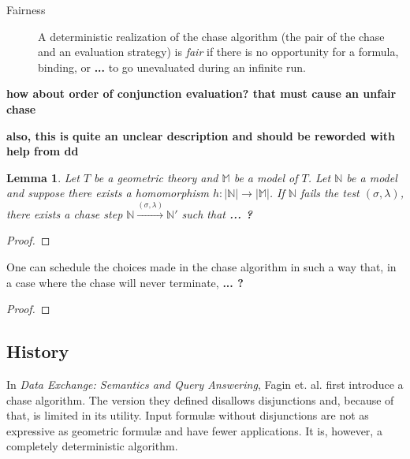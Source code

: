 		\label{fairness_definition}
		\begin{description}
		\item [Fairness] A deterministic realization of the chase algorithm
		(the pair of the chase and an evaluation strategy) is \emph{fair} if
		there is no opportunity for a formula, binding, or \textbf{...} to go
		unevaluated during an infinite run.
		\end{description}

		\textbf{how about order of conjunction evaluation? that must cause an unfair chase}

		\textbf{also, this is quite an unclear description and should be reworded with help from dd}

		\newtheorem{chase_lemma}{Lemma}
		\begin{chase_lemma}
			Let $T$ be a geometric theory and $\mathbb{M}$ be a model of $T$.
			Let $\mathbb{N}$ be a model and suppose there exists a homomorphism
			$h : |\mathbb{N}| \to |\mathbb{M}|$. If $\mathbb{N}$ fails the test
			$(\sigma,\lambda)$, there exists a chase step $\mathbb{N}
			\xrightarrow{(\sigma,\lambda)} \mathbb{N}'$ such that \textbf{... ?}
		\end{chase_lemma}

		\begin{proof}
			
		\end{proof}

		\begin{theorem}
			One can schedule the choices made in the chase algorithm in such a
			way that, in a case where the chase will never terminate,
			\textbf{... ?}
		\end{theorem}

		\begin{proof}
			
		\end{proof}

	\subsection{History}

		In \cite{FKMP02} \emph{Data Exchange: Semantics and Query Answering},
		Fagin et. al. first introduce a chase algorithm. The version they
		defined disallows disjunctions and, because of that, is limited in its
		utility. Input formul{\ae} without disjunctions are not as expressive
		as geometric formul{\ae} and have fewer applications. It is, however, a
		completely deterministic algorithm.

